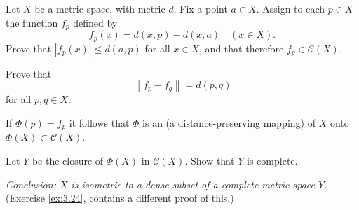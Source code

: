 \begin{myexercise}
    \label{ex:7.24}
    Let $X$ be a metric space, with metric $d$. 
    Fix a point $a \in X$. 
    Assign to each $p \in X$ the function $f_p$ defined by
    \begin{equation*}
        f_p(x) = d(x, p) - d(x, a) \quad (x \in X).
    \end{equation*} 
    Prove that $|f_p (x)| \leq d(a,p)$ for all $x \in X$, 
    and that therefore $f_p \in \mathscr{C}(X)$.
    
    Prove that
    \begin{equation*}
        \left\| f_p-f_q \right\| = d(p, q)
    \end{equation*}
    for all $p, q \in X$. 
    
    If $\Phi(p) = f_p$ it follows that $\Phi$ is an  (a distance-preserving mapping) of $X$ onto $\Phi(X) \subset \mathscr{C}(X)$.
    
    Let $Y$ be the closure of $\Phi(X)$ in $\mathscr{C}(X)$. 
    Show that $Y$ is complete.
    
    \emph{Conclusion: $X$ is isometric to a dense subset of a complete metric space $Y$.}
    (Exercise \ref{ex:3.24}, contains a different proof of this.)
\end{myexercise}



